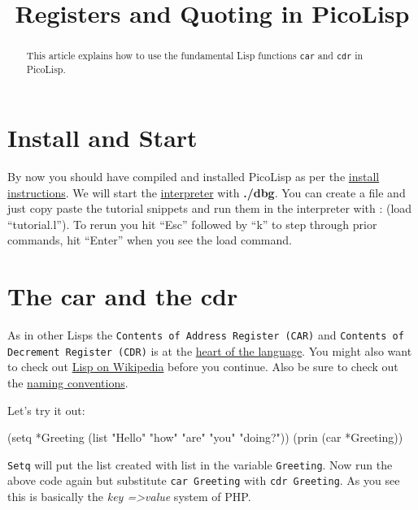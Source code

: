 \title{Registers and Quoting in PicoLisp}

\maketitle

\begin{abstract}
  This article explains how to use the fundamental Lisp functions
  \texttt{car} and \texttt{cdr} in PicoLisp. 
\end{abstract}

\section{Install and Start}
\label{sec:reg-and-quot-install-and-start}

By now you should have compiled and installed PicoLisp as per the
\href{http://www.software-lab.de/INSTALL}{install instructions}. We will
start the \href{http://www.software-lab.de/tut.html#ledit}{interpreter}
with \textbf{./dbg}. You can create a file and just copy paste the tutorial
snippets and run them in the interpreter with : (load ``tutorial.l''). To
rerun you hit ``Esc'' followed by ``k'' to step through prior commands, hit
``Enter'' when you see the load command.

\section{The car and the cdr}
\label{sec:reg-and-quot-the-car-and-the-cdr}

As in other Lisps the \texttt{Contents of Address Register (CAR)} and
\texttt{Contents of Decrement Register (CDR)} is at the
\href{http://www.software-lab.de/ref.html#cell}{heart of the
  language}. You might also want to check out
\href{http://en.wikipedia.org/wiki/Lisp_%28programming_language%29}{Lisp on Wikipedia} before you continue. Also be sure to check out the
  \href{http://www.software-lab.de/ref.html#conv}{naming conventions}.

Let's try it out:

\begin{wideverbatim}
(setq *Greeting (list "Hello" "how" "are" "you" "doing?"))
(prin (car *Greeting))
\end{wideverbatim}

\texttt{Setq} will put the list created with list in the variable \texttt{Greeting}. Now
run the above code again but substitute \texttt{car Greeting} with \texttt{cdr Greeting}.
As you see this is basically the \emph{key =\textgreater  value} system of PHP.

